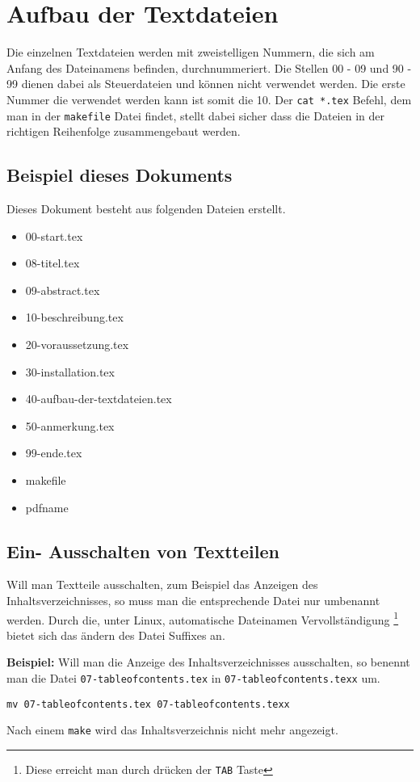 \section{Aufbau der Textdateien}
\label{aufbau_der_textdateien}

Die einzelnen Textdateien werden mit zweistelligen Nummern, 
die sich am Anfang des Dateinamens befinden,
durchnummeriert.
Die Stellen 00 - 09 und 90 - 99 dienen dabei als Steuerdateien 
und können nicht verwendet werden.
Die erste Nummer die verwendet werden kann ist somit die 10.
Der \verb!cat *.tex! Befehl, 
dem man in der \verb!makefile! Datei findet, 
stellt dabei sicher dass die Dateien in der richtigen 
Reihenfolge zusammengebaut werden.



\subsection{Beispiel dieses Dokuments}

Dieses Dokument besteht aus folgenden Dateien erstellt.

\begin{itemize}
	\item 00-start.tex
	\item 08-titel.tex
	\item 09-abstract.tex
	\item 10-beschreibung.tex
	\item 20-voraussetzung.tex
	\item 30-installation.tex
	\item 40-aufbau-der-textdateien.tex
	\item 50-anmerkung.tex
	\item 99-ende.tex
	\item makefile
	\item pdfname
\end{itemize}


\subsection{Ein- Ausschalten von Textteilen}
\label{sec:ein_ausschalten_von_textteilen}

Will man Textteile ausschalten, zum Beispiel das Anzeigen
des Inhaltsverzeichnisses, so muss man die entsprechende Datei
nur umbenannt werden.
Durch die, unter Linux, automatische Dateinamen Vervollständigung%
\footnote{Diese erreicht man durch drücken der \texttt{TAB} Taste}
bietet sich das ändern des Datei Suffixes an.

\textbf{Beispiel:} Will man die Anzeige des Inhaltsverzeichnisses ausschalten,
so benennt man die Datei 
\texttt{07-tableof\-contents\-.tex} in \texttt{07-tableof\-contents\-.texx}
um.

\begin{verbatim}
mv 07-tableofcontents.tex 07-tableofcontents.texx
\end{verbatim}

Nach einem \verb!make! wird das Inhaltsverzeichnis nicht mehr angezeigt.



